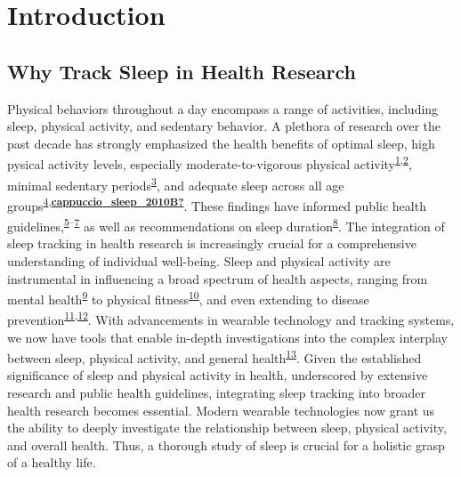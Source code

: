 \documentclass[
  10pt,
]{scrbook}
\begin{document}
\hypertarget{introduction}{%
\chapter{Introduction}\label{introduction}}

\hypertarget{why-track-sleep-in-health-research}{%
\section{Why Track Sleep in Health
Research}\label{why-track-sleep-in-health-research}}

Physical behaviors throughout a day encompass a range of activities,
including sleep, physical activity, and sedentary behavior. A plethora
of research over the past decade has strongly emphasized the health
benefits of optimal sleep, high pysical activity levels, especially
moderate-to-vigorous physical
activity\textsuperscript{\protect\hyperlink{ref-kraus_physical_2019}{1},\protect\hyperlink{ref-lee_effect_2012}{2}},
minimal sedentary
periods\textsuperscript{\protect\hyperlink{ref-wilmot_sedentary_2012}{3}},
and adequate sleep across all age
groups\textsuperscript{\protect\hyperlink{ref-jennum_suxf8vn_sundhed_2015}{4},\protect\hyperlink{ref-cappuccio_sleep_2010B}{\textbf{cappuccio\_sleep\_2010B?}}}.
These findings have informed public health
guidelines,\textsuperscript{\protect\hyperlink{ref-kl_physical_2018}{5}--\protect\hyperlink{ref-el-zine_fysisk_nodate}{7}}
as well as recommendations on sleep
duration\textsuperscript{\protect\hyperlink{ref-hirshkowitz_2015}{8}}.
The integration of sleep tracking in health research is increasingly
crucial for a comprehensive understanding of individual well-being.
Sleep and physical activity are instrumental in influencing a broad
spectrum of health aspects, ranging from mental
health\textsuperscript{\protect\hyperlink{ref-biddle_physical_2011}{9}}
to physical
fitness\textsuperscript{\protect\hyperlink{ref-warburton_health_2017}{10}},
and even extending to disease
prevention\textsuperscript{\protect\hyperlink{ref-strath_guide_2013}{11},\protect\hyperlink{ref-arem_leisure_2015}{12}}.
With advancements in wearable technology and tracking systems, we now
have tools that enable in-depth investigations into the complex
interplay between sleep, physical activity, and general
health\textsuperscript{\protect\hyperlink{ref-rollo_whole_2020}{13}}.
Given the established significance of sleep and physical activity in
health, underscored by extensive research and public health guidelines,
integrating sleep tracking into broader health research becomes
essential. Modern wearable technologies now grant us the ability to
deeply investigate the relationship between sleep, physical activity,
and overall health. Thus, a thorough study of sleep is crucial for a
holistic grasp of a healthy life.
\end{document}
